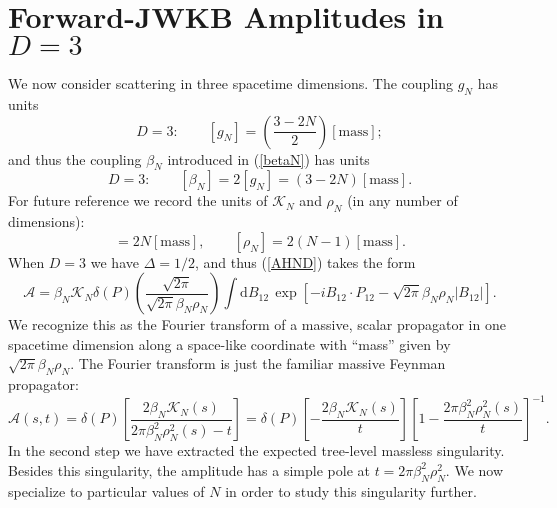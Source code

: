 \section{Forward-JWKB Amplitudes in $D = 3$\label{sec4}}
We now consider scattering in three spacetime dimensions. The coupling $g_{N}$ has units
\begin{equation}
	D = 3: \qquad [g_{N}] = \left( \frac{3 - 2N}{2} \right) [\text{mass}];
\end{equation}
and thus the coupling $\beta_{N}$ introduced in (\ref{betaN}) has units
\begin{equation}
	D = 3: \qquad [\beta_{N}] = 2[g_{N}] = \left(3 - 2N \right) [\text{mass}].
\end{equation}
For future reference we record the units of $\mathcal{K}_{N}$ and $\rho_{N}$ (in any number of dimensions):
\begin{equation}
	[\mathcal{K}_{N}] = 2N [\text{mass}], \qquad [\rho_{N}] = 2(N - 1) [\text{mass}].
\end{equation}
When $D = 3$ we have $\Delta = 1/2$, and thus (\ref{AHND}) takes the form
\begin{equation}
	\mathcal{A} = \beta_{N} \mathcal{K}_{N} \delta(P) \left( \frac{\sqrt{2 \pi}}{\sqrt{2 \pi} \beta_{N} \rho_{N}} \right) \int \mathrm{d}B_{1 2} \, \exp{\left[-i B_{12} \cdot P_{12} - \sqrt{2\pi} \beta_{N} \rho_{N} \vert B_{1 2} \vert \right]}.
\end{equation}
We recognize this as the Fourier transform of a massive, scalar propagator in one spacetime dimension along a space-like coordinate with ``mass'' given by $\sqrt{2\pi} \beta_{N} \rho_{N}$. The Fourier transform is just the familiar massive Feynman propagator:
\begin{equation}
	\mathcal{A}(s, t) = \delta(P) \left[ \frac{2 \beta_{N} \mathcal{K}_{N}(s)}{2 \pi \beta_{N}^{2} \rho_{N}^{2}(s) - t} \right] = \delta(P) \left[- \frac{2 \beta_{N} \mathcal{K}_{N}(s)}{t} \right] \left[ 1 - \frac{2 \pi \beta_{N}^{2} \rho_{N}^{2}(s)}{t} \right]^{-1}.
	\label{AHN3}
\end{equation}
In the second step we have extracted the expected tree-level massless singularity. Besides this singularity, the amplitude has a simple pole at $t = 2 \pi \beta_{N}^{2} \rho_{N}^{2}$. We now specialize to particular values of $N$ in order to study this singularity further.
